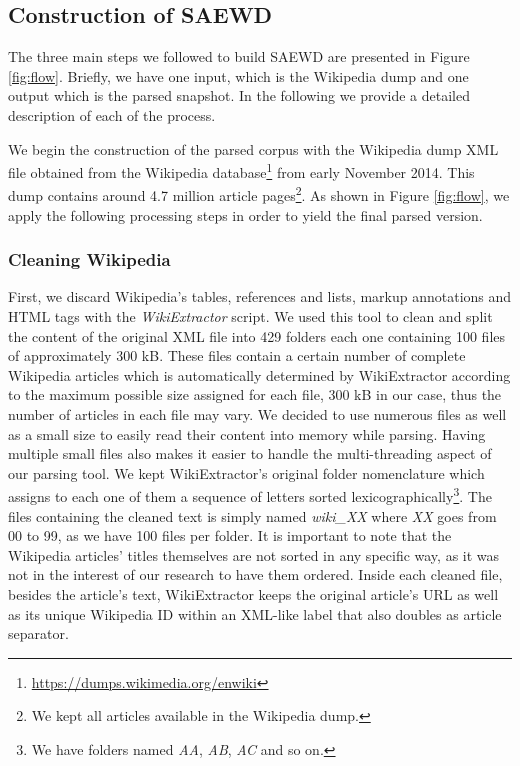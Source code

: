 \subsection{Construction of SAEWD}
The three main steps we followed to build SAEWD are presented in Figure \ref{fig:flow}. Briefly, we have one input, which is the Wikipedia dump and one output which is the parsed snapshot. In the following we provide a detailed description of each of the process. 

 
We begin the construction of the parsed corpus with the Wikipedia dump XML file obtained from the Wikipedia database\footnote{\url{https://dumps.wikimedia.org/enwiki}} from early November 2014. This dump  contains around 4.7 million article pages\footnote{We kept all articles available in the Wikipedia dump.}. As shown in Figure \ref{fig:flow}, we apply the following processing steps in order to yield the final parsed version.
 
\subsubsection{Cleaning Wikipedia} First, we discard Wikipedia's  tables, references and lists, markup annotations and HTML tags with the \textit{WikiExtractor} \cite{Attardi2015}  script. 
We used this tool to clean and split the content of the original XML file into 429 folders each one containing 100 files of approximately 300 kB. These files contain a certain number of complete Wikipedia articles which is automatically determined by WikiExtractor  according to the maximum possible size assigned for each file, 300 kB in our case, thus the number of articles in each file may vary. We decided to use numerous files as well as a small size to easily read their content into memory while parsing. Having multiple small files also makes it easier to handle the multi-threading aspect of our parsing tool.
We kept WikiExtractor's original folder nomenclature which assigns to each one of them a sequence of letters sorted lexicographically\footnote{We have folders named \textit{AA}, \textit{AB}, \textit{AC} and so on.}. The files containing the cleaned text is simply named \textit{wiki\_XX} where  \textit{XX} goes from 00 to 99, as we have 100 files per folder. 
It is important to note that the Wikipedia articles' titles themselves are not sorted in any specific way, as it was not in the interest of our research to have them ordered. 
Inside each cleaned file, besides the article's text, WikiExtractor keeps the original article's URL as well as its unique Wikipedia ID within an XML-like label that also doubles as  article separator. 

